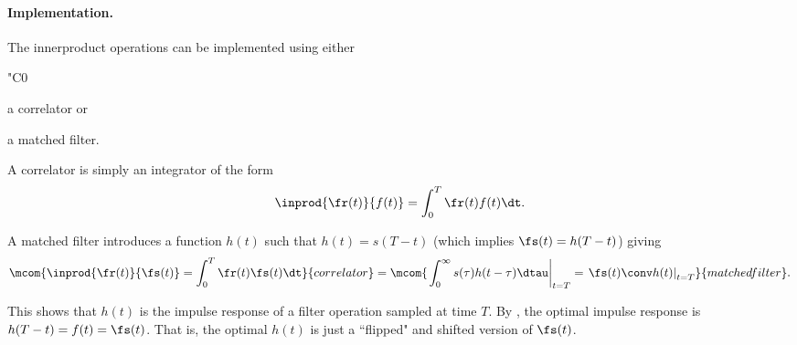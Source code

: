 \paragraph{Implementation.}
The innerproduct operations can be implemented using either
  \begin{dingautolist}{"C0}
     \item a correlator or
     \item a matched filter.
  \end{dingautolist}

A correlator is simply an integrator of the form
   \[ \inprod{\fr(t)}{f(t)} = \int_0^T \fr(t)f(t)\dt.\]

A matched filter introduces a function $h(t)$ such that
$h(t) =s(T-t)$ (which implies $\fs(t)=h(T-t)$) giving
  \[
    \mcom{\inprod{\fr(t)}{\fs(t)} = \int_0^T \fr(t)\fs(t)\dt }
         {correlator}
    =
    \mcom{\left.\int_0^\infty s(\tau)h(t-\tau)\dtau\right|_{t=T}
            = \left.\fs(t)\conv h(t)\right|_{t=T}
         }{matched filter}.
  \]

This shows that $h(t)$ is the impulse response of a filter operation
sampled at time $T$. %
By , the optimal impulse response is
$h(T-t)=f(t)=\fs(t)$.
That is, the optimal $h(t)$ is just a ``flipped" and shifted version of $\fs(t)$.

%



